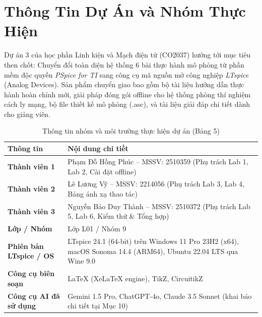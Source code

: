 \documentclass[12pt,a4paper]{report}
\begin{document}

\chapter*{Thông Tin Dự Án và Nhóm Thực Hiện}

Dự án 3 của học phần Linh kiện và Mạch điện tử (CO2037) hướng tới mục tiêu then chốt: Chuyển đổi toàn diện hệ thống 6 bài thực hành mô phỏng từ phần mềm độc quyền \textit{PSpice for TI} sang công cụ mã nguồn mở công nghiệp \textit{LTspice} (Analog Devices). Sản phẩm chuyển giao bao gồm bộ tài liệu hướng dẫn thực hành hoàn chỉnh mới, giải pháp đóng gói offline cho hệ thống phòng thí nghiệm cách ly mạng, bộ file thiết kế mô phỏng (.asc), và tài liệu giải đáp chi tiết dành cho giảng viên.

\vspace{0.5cm}
\begin{table}[H]
\centering
\caption{Thông tin nhóm và môi trường thực hiện dự án (Bảng 5)}
\label{tab:thong_tin_nhom}
\renewcommand{\arraystretch}{1.3}
\begin{tabularx}{\textwidth}{|l|X|}
\hline
\rowcolor{codebg}
\textbf{Thông tin} & \textbf{Nội dung chi tiết} \\ \hline
\textbf{Thành viên 1} & Phạm Đỗ Hồng Phúc -- MSSV: 2510359 (Phụ trách Lab 1, Lab 2, Cài đặt offline) \\ \hline
\textbf{Thành viên 2} & Lê Lương Vỹ -- MSSV: 2214056 (Phụ trách Lab 3, Lab 4, Bảng ánh xạ thao tác) \\ \hline
\textbf{Thành viên 3} & Nguyễn Bảo Duy Thành -- MSSV: 2510372 (Phụ trách Lab 5, Lab 6, Kiểm thử \& Tổng hợp) \\ \hline
\textbf{Lớp / Nhóm} & Lớp L01 / Nhóm 9 \\ \hline
\textbf{Phiên bản LTspice / OS} & LTspice 24.1 (64-bit) trên Windows 11 Pro 23H2 (x64), macOS Sonoma 14.4 (ARM64), Ubuntu 22.04 LTS qua Wine 9.0 \\ \hline
\textbf{Công cụ biên soạn} & LaTeX (XeLaTeX engine), TikZ, CircuitikZ \\ \hline
\textbf{Công cụ AI đã sử dụng} & Gemini 1.5 Pro, ChatGPT-4o, Claude 3.5 Sonnet (khai báo chi tiết tại Mục 10) \\ \hline
\end{tabularx}
\end{table}

\end{document}
